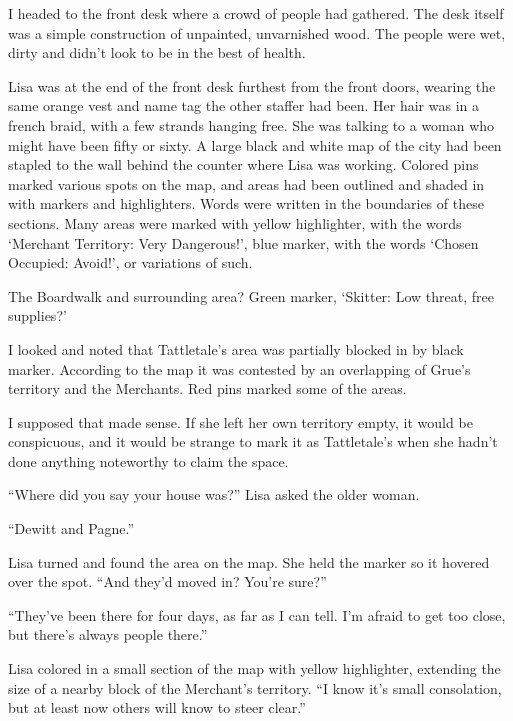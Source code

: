 I headed to the front desk where a crowd of people had gathered.  The desk itself was a simple construction of unpainted, unvarnished wood.  The people were wet, dirty and didn't look to be in the best of health.



Lisa was at the end of the front desk furthest from the front doors, wearing the same orange vest and name tag the other staffer had been.  Her hair was in a french braid, with a few strands hanging free.  She was talking to a woman who might have been fifty or sixty.  A large black and white map of the city had been stapled to the wall behind the counter where Lisa was working.  Colored pins marked various spots on the map, and areas had been outlined and shaded in with markers and highlighters.  Words were written in the boundaries of these sections.  Many areas were marked with yellow highlighter, with the words `Merchant Territory: Very Dangerous!', blue marker, with the words `Chosen Occupied: Avoid!', or variations of such.



The Boardwalk and surrounding area?  Green marker, `Skitter: Low threat, free supplies?'



I looked and noted that Tattletale's area was partially blocked in by black marker.  According to the map it was contested by an overlapping of Grue's territory and the Merchants.  Red pins marked some of the areas.



I supposed that made sense.  If she left her own territory empty, it would be conspicuous, and it would be strange to mark it as Tattletale's when she hadn't done anything noteworthy to claim the space.



``Where did you say your house was?'' Lisa asked the older woman.



``Dewitt and Pagne.''



Lisa turned and found the area on the map.  She held the marker so it hovered over the spot.  ``And they'd moved in?  You're sure?''



``They've been there for four days, as far as I can tell.  I'm afraid to get too close, but there's always people there.''



Lisa colored in a small section of the map with yellow highlighter, extending the size of a nearby block of the Merchant's territory.  ``I know it's small consolation, but at least now others will know to steer clear.''



